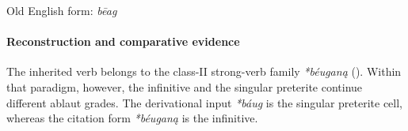 \documentclass[
  british,
  a4paper,
]{article}
\begin{document}
\begingroup
\setlength{\fboxsep}{6pt}

\noindent{} \endgroup

Old English form: \emph{bēag}

\paragraph{Reconstruction and comparative
evidence}\label{reconstruction-and-comparative-evidence-41}

The inherited verb belongs to the class-II strong-verb family
\emph{*béuganą} (). Within that paradigm, however, the infinitive and the singular
preterite continue different ablaut grades. The derivational input
\emph{*báug} is the singular preterite cell, whereas the citation form
\emph{*béuganą} is the infinitive.
\end{document}
